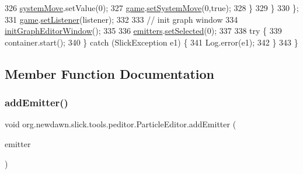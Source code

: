 \begin{DoxyCode}
326                     \mbox{\hyperlink{classorg_1_1newdawn_1_1slick_1_1tools_1_1peditor_1_1_particle_editor_a59b07ee0b275f384b9dd38e6323930da}{systemMove}}.setValue(0);
327                     \mbox{\hyperlink{classorg_1_1newdawn_1_1slick_1_1tools_1_1peditor_1_1_particle_editor_a30ffb1c9b34c421c0ef6a28efbaaa450}{game}}.\mbox{\hyperlink{classorg_1_1newdawn_1_1slick_1_1tools_1_1peditor_1_1_particle_game_ab80789f63417c1a3b58bb9f487f0f876}{setSystemMove}}(0,\textcolor{keyword}{true});
328                 \}
329             \}
330         \};
331         \mbox{\hyperlink{classorg_1_1newdawn_1_1slick_1_1tools_1_1peditor_1_1_particle_editor_a30ffb1c9b34c421c0ef6a28efbaaa450}{game}}.\mbox{\hyperlink{classorg_1_1newdawn_1_1slick_1_1tools_1_1peditor_1_1_particle_game_af9fefc9bcbfbb9fe305f823dd7052207}{setListener}}(listener);
332         
333         \textcolor{comment}{// init graph window}
334         \mbox{\hyperlink{classorg_1_1newdawn_1_1slick_1_1tools_1_1peditor_1_1_particle_editor_a097c7e7831411e3c05dba0688e7cbeba}{initGraphEditorWindow}}();
335 
336         \mbox{\hyperlink{classorg_1_1newdawn_1_1slick_1_1tools_1_1peditor_1_1_particle_editor_adf3a8d24a0adf9e68e06a87f37ff378a}{emitters}}.\mbox{\hyperlink{classorg_1_1newdawn_1_1slick_1_1tools_1_1peditor_1_1_emitter_list_a2d4c1c8b76d20c25f3a7183ab5b4cd25}{setSelected}}(0);
337         
338         \textcolor{keywordflow}{try} \{
339             container.start();
340         \} \textcolor{keywordflow}{catch} (SlickException e1) \{
341             Log.error(e1);
342         \}
343     \}
\end{DoxyCode}


\subsection{Member Function Documentation}
\mbox{\label{classorg_1_1newdawn_1_1slick_1_1tools_1_1peditor_1_1_particle_editor_a629e50ff72b6441ac93f15ae64073f2c}} 
\subsubsection{\texorpdfstring{add\+Emitter()}{addEmitter()}}
{\footnotesize\ttfamily void org.\+newdawn.\+slick.\+tools.\+peditor.\+Particle\+Editor.\+add\+Emitter (\begin{DoxyParamCaption}\item[{\mbox{\hyperlink{classorg_1_1newdawn_1_1slick_1_1particles_1_1_configurable_emitter}{Configurable\+Emitter}}}]{emitter }\end{DoxyParamCaption})\hspace{0.3cm}{\ttfamily [inline]}}

